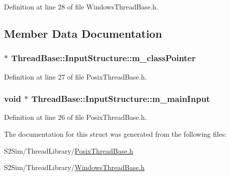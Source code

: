 Definition at line 28 of file Windows\-Thread\-Base.\-h.



\subsection{Member Data Documentation}
\hypertarget{struct_thread_base_1_1_input_structure_af522f05c6feb189c62b450a7eb344986}{
\subsubsection[{m\-\_\-class\-Pointer}]{ $\ast$ Thread\-Base\-::\-Input\-Structure\-::m\-\_\-class\-Pointer}}\label{struct_thread_base_1_1_input_structure_af522f05c6feb189c62b450a7eb344986}


Definition at line 27 of file Posix\-Thread\-Base.\-h.

\hypertarget{struct_thread_base_1_1_input_structure_ab91961eacdcce8b1628f46a1a116fa1e}{
\subsubsection[{m\-\_\-main\-Input}]{\setlength{\rightskip}{0pt plus 5cm}void $\ast$ Thread\-Base\-::\-Input\-Structure\-::m\-\_\-main\-Input}}\label{struct_thread_base_1_1_input_structure_ab91961eacdcce8b1628f46a1a116fa1e}


Definition at line 26 of file Posix\-Thread\-Base.\-h.



The documentation for this struct was generated from the following files\-:\begin{DoxyCompactItemize}
\item 
S2\-Sim/\-Thread\-Library/\hyperlink{_posix_thread_base_8h}{Posix\-Thread\-Base.\-h}\item 
S2\-Sim/\-Thread\-Library/\hyperlink{_windows_thread_base_8h}{Windows\-Thread\-Base.\-h}\end{DoxyCompactItemize}
